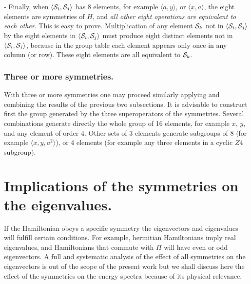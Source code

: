 {- Finally, when  $\langle {\cal S}_{i},{\cal S}_{j}\rangle$ has 8 elements, for example $\langle a,y\rangle$,
or $\langle x,a\rangle$, the eight elements are symmetries of $H$,
and {\it all other eight operations are equivalent to each other}. This is easy to prove. Multiplication of
any element ${\cal S}_k$ not in $\langle {\cal S}_{i},{\cal S}_{j}\rangle$ by the eight elements in $\langle {\cal S}_{i},{\cal S}_{j}\rangle$ must produce eight distinct elements not in $\langle {\cal S}_{i},{\cal S}_{j}\rangle$, because in the  group table each
element appears only once in any column (or row). These eight elements  are all equivalent to ${\cal S}_k$.
%
%
\subsubsection{Three or more symmetries.}
%
%
With three or more symmetries one may proceed similarly applying and combining the
results of the previous two subsections.
It is advisable to construct first the group generated by
the three superoperators of the symmetries. Several combinations  generate  directly the whole group of 16 elements,
for example $x$, $y$, and any element of order 4.  Other sets of 3 elements generate subgroups of 8 (for example
$\langle x,y,a^2\rangle$), or 4 elements (for example any three elements in a cyclic $Z4$ subgroup).
%
%
\section{Implications of the symmetries on the eigenvalues.\label{sp}}
%
%
If the Hamiltonian obeys a specific symmetry the eigenvectors and eigenvalues will fulfill certain conditions.
For example,  hermitian Hamiltonians imply real eigenvalues, and Hamiltonians that commute with
$\Pi$ will have even or odd eigenvectors.
A full and systematic analysis of the effect of all symmetries on the eigenvectors  is out of the scope of the present work
but we shall discuss here the
effect of the symmetries on the energy spectra because of its physical relevance.


}
